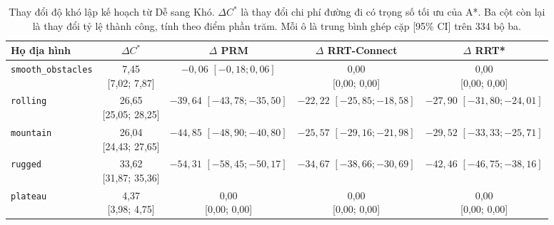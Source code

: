 \documentclass[11pt]{article}
\begin{document}
\begin{table}[htbp]
  \centering
  \caption{Thay đổi độ khó lập kế hoạch từ Dễ sang Khó. $\Delta C^*$ là thay đổi
  chi phí đường đi có trọng số tối ưu của A*. Ba cột còn lại là thay đổi tỷ lệ
  thành công, tính theo điểm phần trăm. Mỗi ô là trung bình ghép cặp [95\% CI]
  trên 334 bộ ba.}
  \label{tab:paired-planning-effects}
  \footnotesize
  \setlength{\tabcolsep}{4pt}
  \renewcommand{\arraystretch}{1.15}
  \begin{tabular}{lcccc}
    \toprule
    Họ địa hình & $\Delta C^*$ & $\Delta$ PRM & $\Delta$ RRT-Connect & $\Delta$ RRT* \\
    \midrule
    \texttt{smooth\_obstacles} & \shortstack{7,45\\{[7,02; 7,87]}} &
      \shortstack{$-0{,}06$\\{$[-0{,}18; 0{,}06]$}} &
      \shortstack{0,00\\{[0,00; 0,00]}} & \shortstack{0,00\\{[0,00; 0,00]}} \\
    \texttt{rolling} & \shortstack{26,65\\{[25,05; 28,25]}} &
      \shortstack{$-39{,}64$\\{$[-43{,}78; -35{,}50]$}} &
      \shortstack{$-22{,}22$\\{$[-25{,}85; -18{,}58]$}} &
      \shortstack{$-27{,}90$\\{$[-31{,}80; -24{,}01]$}} \\
    \texttt{mountain} & \shortstack{26,04\\{[24,43; 27,65]}} &
      \shortstack{$-44{,}85$\\{$[-48{,}90; -40{,}80]$}} &
      \shortstack{$-25{,}57$\\{$[-29{,}16; -21{,}98]$}} &
      \shortstack{$-29{,}52$\\{$[-33{,}33; -25{,}71]$}} \\
    \texttt{rugged} & \shortstack{33,62\\{[31,87; 35,36]}} &
      \shortstack{$-54{,}31$\\{$[-58{,}45; -50{,}17]$}} &
      \shortstack{$-34{,}67$\\{$[-38{,}66; -30{,}69]$}} &
      \shortstack{$-42{,}46$\\{$[-46{,}75; -38{,}16]$}} \\
    \texttt{plateau} & \shortstack{4,37\\{[3,98; 4,75]}} &
      \shortstack{0,00\\{[0,00; 0,00]}} &
      \shortstack{0,00\\{[0,00; 0,00]}} & \shortstack{0,00\\{[0,00; 0,00]}} \\
    \bottomrule
  \end{tabular}
\end{table}
\end{document}
